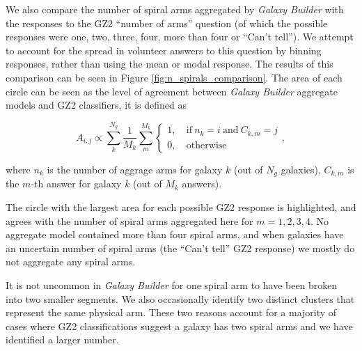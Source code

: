 \documentclass[../main.tex]{subfiles}
\begin{document}
We also compare the number of spiral arms aggregated by \textit{Galaxy Builder} with the responses to the GZ2 ``number of arms'' question (of which the possible responses were one, two, three, four, more than four or ``Can't tell''). We attempt to account for the spread in volunteer answers to this question by binning responses, rather than using the mean or modal response. The results of this comparison can be seen in Figure \ref{fig:n_spirals_comparison}. The area of each circle can be seen as the level of agreement between \textit{Galaxy Builder} aggregate models and GZ2 classifiers, it is defined as

\begin{equation}
  \label{eq:spiral_circle_area_size}
  A_{i, j} \propto \sum_{k}^{N_g}\frac{1}{M_k}\sum_{m}^{M_k}
  \begin{cases}
    1,&\ \mathrm{if}\ n_k = i\ \mathrm{and}\ C_{k, m} = j\\
    0,&\ \mathrm{otherwise}
  \end{cases},
\end{equation}

where $n_k$ is the number of aggrage arms for galaxy $k$ (out of $N_g$ galaxies), $C_{k, m}$ is the $m$-th answer for galaxy $k$ (out of $M_k$ answers).

The circle with the largest area for each possible GZ2 response is highlighted, and agrees with the number of spiral arms aggregated here for $m=1, 2, 3, 4$. No aggregate model contained more than four spiral arms, and when galaxies have an uncertain number of spiral arms (the ``Can't tell'' GZ2 response) we mostly do not aggregate any spiral arms.

It is not uncommon in \textit{Galaxy Builder} for one spiral arm to have been broken into two smaller segments. We also occasionally identify two distinct clusters that represent the same physical arm. These two reasons account for a majority of cases where GZ2 classifications suggest a galaxy has two spiral arms and we have identified a larger number.
\end{document}

